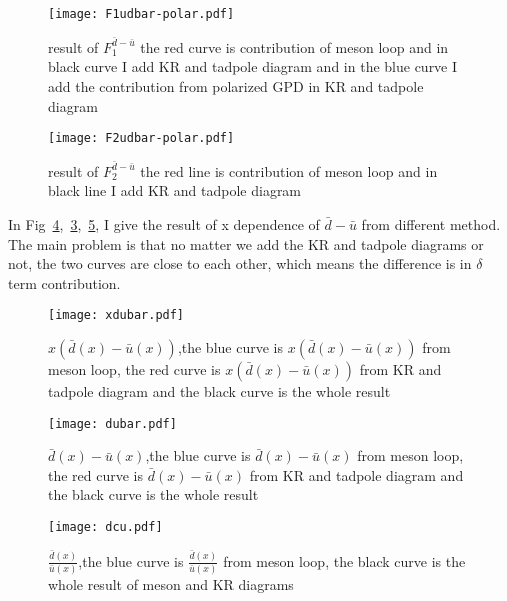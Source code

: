\documentclass[preprintnumbers,prd,superscriptaddress,preprint]{revtex4-1}
\begin{document}
	\begin{figure}[h]
		\begin{center}
			\texttt{[image: F1udbar-polar.pdf]}
			\caption{result of $F^{\bar{d}-\bar{u}}_{1}$ the red curve is contribution of meson loop and in black curve I add KR and tadpole diagram and in the blue curve I add the contribution from polarized GPD in KR and tadpole diagram} 
			\label{F1udbarpo}
		\end{center}
	\end{figure}
	\begin{figure}[h]
		\begin{center}
			\texttt{[image: F2udbar-polar.pdf]}
			\caption{result of $F^{\bar{d}-\bar{u}}_{2
				}$ the red line is contribution of meson loop and in black line I add KR and tadpole diagram} 
			\label{F2udbarpo}
		\end{center}
	\end{figure} 
	In Fig~\ref{dubar},~\ref{xdubar},~\ref{dcu}, I give the result of x dependence of $\bar{d}-\bar{u}$ from different method. The main problem is that no matter we add the KR and tadpole diagrams or not, the two curves are close to each other, which means the difference is in $\delta$ term contribution.
	\begin{figure}[h]
		\begin{center}
			\texttt{[image: xdubar.pdf]}
			\caption{$x(\bar{d}(x)-\bar{u}(x))$,the blue curve is $x(\bar{d}(x)-\bar{u}(x))$ from meson loop, the red curve is $x(\bar{d}(x)-\bar{u}(x))$ from KR and tadpole diagram and the black curve is the whole result } 
			\label{xdubar}
		\end{center}
	\end{figure}
	\begin{figure}[h]
		\begin{center}
			\texttt{[image: dubar.pdf]}
			\caption{$\bar{d}(x)-\bar{u}(x)$,the blue curve is $\bar{d}(x)-\bar{u}(x)$ from meson loop, the red curve is $\bar{d}(x)-\bar{u}(x)$ from KR and tadpole diagram and the black curve is the whole result } 
			\label{dubar}
		\end{center}
	\end{figure}
	\begin{figure}[h]
		\begin{center}
			\texttt{[image: dcu.pdf]}
			\caption{$\frac{\bar{d}(x)}{\bar{u}(x)}$,the blue curve is $\frac{\bar{d}(x)}{\bar{u}(x)}$ from meson loop, the black curve is the whole result of meson and KR diagrams} 
			\label{dcu}
		\end{center}
	\end{figure}
	
\end{document}
